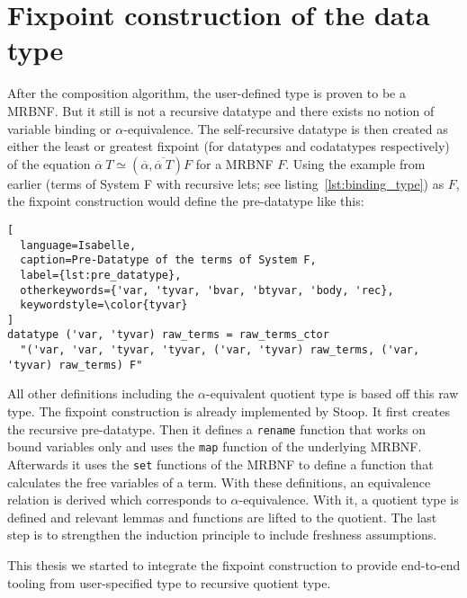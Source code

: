 \section{Fixpoint construction of the data type}\label{sec:fixpoint}

After the composition algorithm, the user-defined type is proven to be a \ac{MRBNF}. But it still is not a recursive datatype and there exists no notion of variable binding or $\alpha$-equivalence. The self-recursive datatype is then created as either the least or greatest fixpoint (for datatypes and codatatypes respectively) of the equation $\overline{\alpha} \: T \simeq (\overline{\alpha}, \overline{\overline{\alpha} \: T}) F$ for a \ac{MRBNF} $F$. Using the example from earlier (terms of System F with recursive lets; see listing~\ref{lst:binding_type}) as $F$, the fixpoint construction would define the pre-datatype like this:

\begin{lstlisting}[
  language=Isabelle,
  caption=Pre-Datatype of the terms of System F,
  label={lst:pre_datatype},
  otherkeywords={'var, 'tyvar, 'bvar, 'btyvar, 'body, 'rec},
  keywordstyle=\color{tyvar}
]
datatype ('var, 'tyvar) raw_terms = raw_terms_ctor
  "('var, 'var, 'tyvar, 'tyvar, ('var, 'tyvar) raw_terms, ('var, 'tyvar) raw_terms) F"
\end{lstlisting}

All other definitions including the $\alpha$-equivalent quotient type is based off this raw type. The fixpoint construction is already implemented by Stoop\cite{mrbnf_fixpoint}. It first creates the recursive pre-datatype. Then it defines a \texttt{rename} function that works on bound variables only and uses the \texttt{map} function of the underlying \ac{MRBNF}. Afterwards it uses the \texttt{set} functions of the \ac{MRBNF} to define a function that calculates the free variables of a term. With these definitions, an equivalence relation is derived which corresponds to $\alpha$-equivalence. With it, a quotient type is defined and relevant lemmas and functions are lifted to the quotient. The last step is to strengthen the induction principle to include freshness assumptions.

This thesis we started to integrate the fixpoint construction to provide end-to-end tooling from user-specified type to recursive quotient type.
